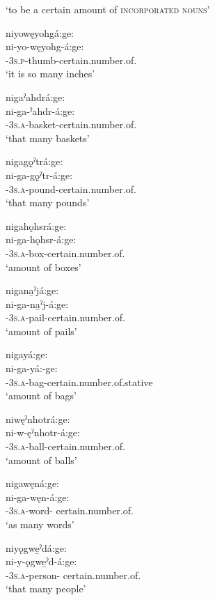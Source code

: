 \ea\label{ex:niex6}  ‘to be a certain amount of \textsc{incorporated nouns}’

\ea niyowęyohgá:ge:\\
\gll ni-yo-węyohg-á:ge:\\
{\partitive}-\textsc{3s.p}-thumb-certain.number.of.{\stative}\\
\glt `it is so many inches'

\ex nigaˀahdrá:ge: \\
\gll ni-ga-ˀahdr-á:ge: \\
\textsc{\partitive-3s.a}-basket-certain.number.of.{\stative}\\
\glt ‘that many baskets’

\ex nigagǫ̱ˀtrá:ge:\\
\gll ni-ga-gǫ̱ˀtr-á:ge:\\
\textsc{\partitive-3s.a}-pound-certain.number.of.{\stative}\\
\glt `that many pounds'

\ex nigahǫhsrá:ge:\\
\gll ni-ga-hǫhsr-á:ge:\\
{\partitive}-\textsc{3s.a}-box-certain.number.of.{\stative}\\
\glt `amount of boxes'

\ex nigana̱ˀjá:ge:\\
\gll ni-ga-na̱ˀj-á:ge:\\
{\partitive}-\textsc{3s.a}-pail-certain.number.of.{\stative}\\
\glt `amount of pails'

\newpage

\ex nigayá:ge:\\
\gll ni-ga-yá:-ge:\\
{\partitive}-\textsc{3s.a}-bag-certain.number.of.stative\\
\glt `amount of bags'

\ex niwęˀnhotrá:ge:\\
\gll ni-w-ęˀnhotr-á:ge:\\
{\partitive}-\textsc{3s.a}-ball-certain.number.of.{\stative}\\
\glt `amount of balls'

\ex nigawęná:ge:\\
\gll ni-ga-węn-á:ge:\\
{\partitive}-\textsc{3s.a}-word- certain.number.of.{\stative}\\
\glt `as many words'

\ex niyǫgwe̱ˀdá:ge:\\
\gll ni-y-ǫgwe̱ˀd-á:ge:\\
{\partitive}-\textsc{3s.a}-person- certain.number.of.{\stative}\\
\glt `that many people'
\z
\z



